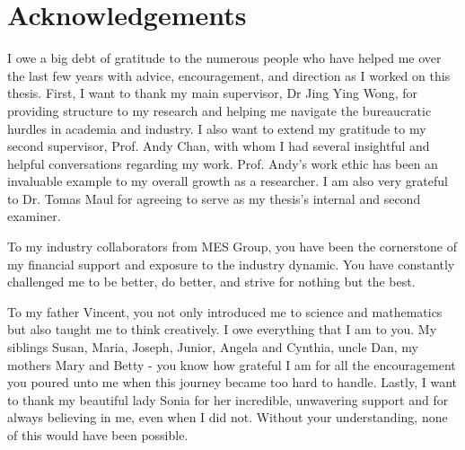 \chapter*{Acknowledgements}
\setcounter{page}{1}
I owe a big debt of gratitude to the numerous people who have helped me over the last few years with advice, encouragement, and direction as I worked on this thesis. First, I want to thank my main supervisor, Dr Jing Ying Wong, for providing structure to my research and helping me navigate the bureaucratic hurdles in academia and industry. I also want to extend my gratitude to my second supervisor, Prof. Andy Chan, with whom I had several insightful and helpful conversations regarding my work. Prof. Andy's work ethic has been an invaluable example to my overall growth as a researcher. I am also very grateful to Dr. Tomas Maul for agreeing to serve as my thesis's internal and second examiner. 

To my industry collaborators from MES Group, you have been the cornerstone of my financial support and exposure to the industry dynamic. You have constantly challenged me to be better, do better, and strive for nothing but the best. 

To my father Vincent, you not only introduced me to science and mathematics but also taught me to think creatively. I owe everything that I am to you. My siblings Susan, Maria, Joseph, Junior, Angela and Cynthia, uncle Dan, my mothers Mary and Betty - you know how grateful I am for all the encouragement you poured unto me when this journey became too hard to handle. Lastly, I want to thank my beautiful lady Sonia for her incredible, unwavering support and for always believing in me, even when I did not. Without your understanding, none of this would have been possible.
